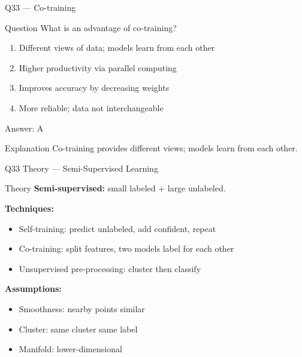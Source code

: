 \documentclass[aspectratio=169,8pt]{beamer}
\begin{document}
	\begin{frame}{Q33 --- Co-training}
		\begin{block}{Question}
			What is an advantage of co-training?
		\end{block}
		\begin{enumerate}[label=\Alph*.]
			\item Different views of data; models learn from each other
			\item Higher productivity via parallel computing
			\item Improves accuracy by decreasing weights
			\item More reliable; data not interchangeable
		\end{enumerate}
		\begin{exampleblock}{Answer: A}
		\end{exampleblock}
		\begin{block}{Explanation}
			Co-training provides different views; models learn from each other.
		\end{block}
	\end{frame}
	
	\begin{frame}{Q33 Theory --- Semi-Supervised Learning}
		\begin{block}{Theory}
			\textbf{Semi-supervised:} small labeled + large unlabeled.
			\vspace{2mm}
			
			\textbf{Techniques:}
			\begin{itemize}
				\item Self-training: predict unlabeled, add confident, repeat
				\item Co-training: split features, two models label for each other
				\item Unsupervised pre-processing: cluster then classify
			\end{itemize}
			\textbf{Assumptions:}
			\begin{itemize}
				\item Smoothness: nearby points similar
				\item Cluster: same cluster same label
				\item Manifold: lower-dimensional
			\end{itemize}
		\end{block}
	\end{frame}
	
\end{document}
